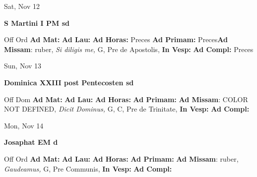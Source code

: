 \documentclass[10pt]{memoir}
\begin{document}
\begin{center}
\begin{minipage}{3.5in}
\vspace{2em}
\begin{center}Sat, Nov 12
\end{center}
\textbf{ \large S Martini I PM
\textnormal{\normalsize sd}}

\begin{justify}Off Ord
\textbf{Ad Mat: }
\textbf{Ad Lau: }
\textbf{Ad Horas: }Preces
\textbf{Ad Primam: }Preces\textbf{Ad Missam}: ruber, \textit{Si diligis me,} G, Pre de Apostolis, 
\textbf{In Vesp: }
\textbf{Ad Compl: }Preces
\end{justify}
\end{minipage}
\end{center}

\begin{center}
\begin{minipage}{3.5in}
\vspace{2em}
\begin{center}Sun, Nov 13
\end{center}
\textbf{ \large Dominica XXIII post Pentecosten
\textnormal{\normalsize sd}}

\begin{justify}Off Dom
\textbf{Ad Mat: }
\textbf{Ad Lau: }
\textbf{Ad Horas: }
\textbf{Ad Primam: }\textbf{Ad Missam}: COLOR NOT DEFINED, \textit{Dicit Dominus,} G, C, Pre de Trinitate, 
\textbf{In Vesp: }
\textbf{Ad Compl: }
\end{justify}
\end{minipage}
\end{center}

\begin{center}
\begin{minipage}{3.5in}
\vspace{2em}
\begin{center}Mon, Nov 14
\end{center}
\textbf{ \large Josaphat EM
\textnormal{\normalsize d}}

\begin{justify}Off Ord
\textbf{Ad Mat: }
\textbf{Ad Lau: }
\textbf{Ad Horas: }
\textbf{Ad Primam: }\textbf{Ad Missam}: ruber, \textit{Gaudeamus,} G, Pre Communis, 
\textbf{In Vesp: }
\textbf{Ad Compl: }
\end{justify}
\end{minipage}
\end{center}
\end{document}
